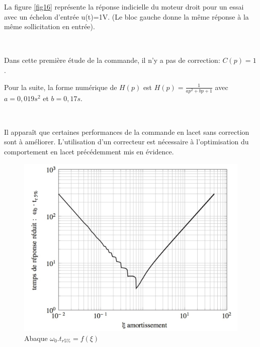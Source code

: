 La figure \ref{fig16} représente la réponse indicielle du moteur droit pour un essai avec un échelon d’entrée u(t)=1V. (Le bloc gauche donne la même réponse à la même sollicitation en entrée).


~\

Dans cette première étude de la commande, il n’y a pas de correction: $C(p)=1$.


Pour la suite, la forme numérique de $H(p)$ est $H(p)=\frac{1}{ap^2+bp+1}$ avec $a=0,019s^2$ et $b=0,17s$.



~\

Il apparaît que certaines performances de la commande en lacet sans correction sont à améliorer. L’utilisation d’un correcteur est nécessaire à l’optimisation du comportement en lacet précédemment mis en évidence.

\begin{figure}[!ht]\begin{center}
 \includegraphics[width=0.7\linewidth]{img/figure_17}
 \caption{Abaque $\omega_0.t_{r5\%}=f(\xi)$}
 \label{fig17}
\end{center}\end{figure}

